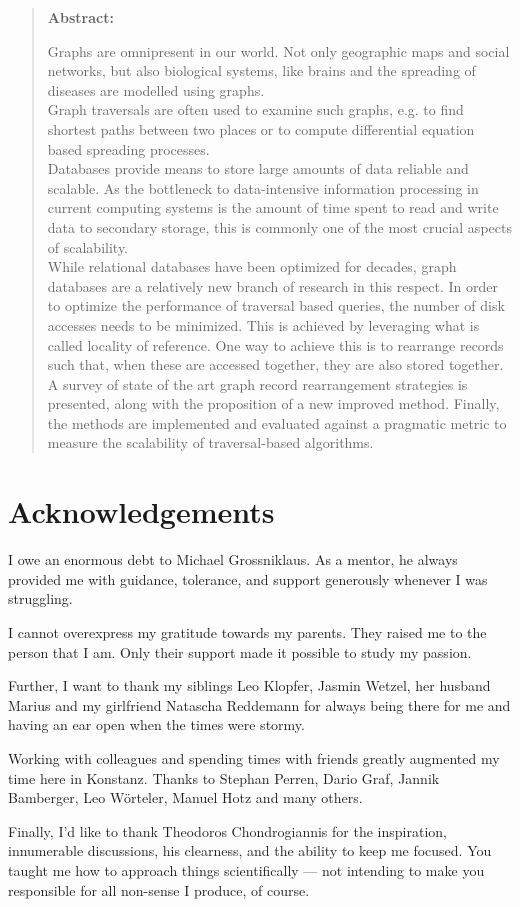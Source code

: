 \begin{abstract}
\begin{center}
    \textbf{Abstract:}
\end{center}{}
Graphs are omnipresent in our world. 
Not only geographic maps and social networks, but also biological systems, like brains and the spreading of diseases are modelled using graphs. \\
Graph traversals are often used to examine such graphs, e.g. to find shortest paths between two places or to compute differential equation based spreading processes. \\
Databases provide means to store large amounts of data reliable and scalable. 
As the bottleneck to data-intensive information processing in current computing systems is the amount of time spent to read and write data to secondary storage, this is commonly one of the most crucial aspects of scalability. \\
While relational databases have been optimized for decades, graph databases are a relatively new branch of research in this respect.
In order to optimize the performance of traversal based queries, the number of disk accesses needs to be minimized. 
This is achieved by leveraging what is called locality of reference.
One way to achieve this is to rearrange records such that, when these are accessed together, they are also stored together. \\
A survey of state of the art graph record rearrangement strategies is presented, along with the proposition of a new improved method.
Finally, the methods are implemented and evaluated against a pragmatic metric to measure the scalability of traversal-based algorithms.
\end{abstract}

\newpage
\section*{Acknowledgements}
I owe an enormous debt to Michael Grossniklaus. 
As a mentor, he always provided me with guidance, tolerance, and support generously whenever I was struggling.

I cannot overexpress my gratitude towards my parents.
They raised me to the person that I am.
Only their support made it possible to study my passion.

Further, I want to thank my siblings Leo Klopfer, Jasmin Wetzel, her husband Marius and my girlfriend Natascha Reddemann for always being there for me and having an ear open when the times were stormy.

Working with colleagues and spending times with friends greatly augmented my time here in Konstanz. Thanks to Stephan Perren, Dario Graf, Jannik Bamberger, Leo Wörteler, Manuel Hotz and many others.


Finally, I'd like to thank Theodoros Chondrogiannis for the inspiration, innumerable discussions, his clearness, and the ability to keep me focused. 
You taught me how to approach things scientifically --- not intending to make you responsible for all non-sense I produce, of course.
\newpage

